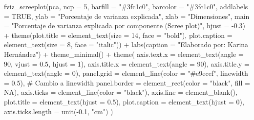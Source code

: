 \documentclass[
  10pt,
  letterpaper,
  DIV=11,
  numbers=noendperiod]{scrreprt}
\newenvironment{Shaded}{\begin{snugshade}}{\end{snugshade}}
\newcommand{\AttributeTok}[1]{\textcolor[rgb]{0.40,0.45,0.13}{#1}}
\newcommand{\CommentTok}[1]{\textcolor[rgb]{0.37,0.37,0.37}{#1}}
\newcommand{\ConstantTok}[1]{\textcolor[rgb]{0.56,0.35,0.01}{#1}}
\newcommand{\DecValTok}[1]{\textcolor[rgb]{0.68,0.00,0.00}{#1}}
\newcommand{\FloatTok}[1]{\textcolor[rgb]{0.68,0.00,0.00}{#1}}
\newcommand{\FunctionTok}[1]{\textcolor[rgb]{0.28,0.35,0.67}{#1}}
\newcommand{\NormalTok}[1]{\textcolor[rgb]{0.00,0.23,0.31}{#1}}
\newcommand{\SpecialCharTok}[1]{\textcolor[rgb]{0.37,0.37,0.37}{#1}}
\newcommand{\StringTok}[1]{\textcolor[rgb]{0.13,0.47,0.30}{#1}}
\begin{document}
\begin{Shaded}
\begin{Highlighting}[numbers=left,,]
\FunctionTok{fviz\_screeplot}\NormalTok{(pca,}
               \AttributeTok{ncp =} \DecValTok{5}\NormalTok{,}
               \AttributeTok{barfill =} \StringTok{"\#3fc1c0"}\NormalTok{,}
               \AttributeTok{barcolor =} \StringTok{"\#3fc1c0"}\NormalTok{,}
               \AttributeTok{addlabels =} \ConstantTok{TRUE}\NormalTok{,}
               \AttributeTok{ylab =} \StringTok{"Porcentaje de varianza explicada"}\NormalTok{,}
               \AttributeTok{xlab =} \StringTok{"Dimensiones"}\NormalTok{,}
               \AttributeTok{main =} \StringTok{"Porcentaje de varianza explicada por componente (Scree plot)"}\NormalTok{,}
               \AttributeTok{hjust =} \SpecialCharTok{{-}}\FloatTok{0.3}\NormalTok{) }\SpecialCharTok{+}
  \FunctionTok{theme}\NormalTok{(}\AttributeTok{plot.title =} \FunctionTok{element\_text}\NormalTok{(}\AttributeTok{size =} \DecValTok{14}\NormalTok{, }\AttributeTok{face =} \StringTok{"bold"}\NormalTok{),}
        \AttributeTok{plot.caption =} \FunctionTok{element\_text}\NormalTok{(}\AttributeTok{size =} \DecValTok{8}\NormalTok{, }\AttributeTok{face =} \StringTok{"italic"}\NormalTok{)) }\SpecialCharTok{+}
  \FunctionTok{labs}\NormalTok{(}\AttributeTok{caption =} \StringTok{"Elaborado por: Karina Hernández"}\NormalTok{) }\SpecialCharTok{+}
  \FunctionTok{theme\_minimal}\NormalTok{() }\SpecialCharTok{+}
    \FunctionTok{theme}\NormalTok{(}
        \AttributeTok{axis.text.x =} \FunctionTok{element\_text}\NormalTok{(}\AttributeTok{angle =} \DecValTok{90}\NormalTok{, }\AttributeTok{vjust =} \FloatTok{0.5}\NormalTok{, }\AttributeTok{hjust =} \DecValTok{1}\NormalTok{),}
        \AttributeTok{axis.title.x =} \FunctionTok{element\_text}\NormalTok{(}\AttributeTok{angle =} \DecValTok{90}\NormalTok{),}
        \AttributeTok{axis.title.y =} \FunctionTok{element\_text}\NormalTok{(}\AttributeTok{angle =} \DecValTok{0}\NormalTok{),}
        \AttributeTok{panel.grid =} \FunctionTok{element\_line}\NormalTok{(}\AttributeTok{color =} \StringTok{"\#e9ecef"}\NormalTok{, }\AttributeTok{linewidth =} \FloatTok{0.5}\NormalTok{),  }\CommentTok{\# Cambio a linewidth}
        \AttributeTok{panel.border =} \FunctionTok{element\_rect}\NormalTok{(}\AttributeTok{color =} \StringTok{"black"}\NormalTok{, }\AttributeTok{fill =} \ConstantTok{NA}\NormalTok{),}
        \AttributeTok{axis.ticks =} \FunctionTok{element\_line}\NormalTok{(}\AttributeTok{color =} \StringTok{"black"}\NormalTok{),}
        \AttributeTok{axis.line =} \FunctionTok{element\_blank}\NormalTok{(),}
        \AttributeTok{plot.title =} \FunctionTok{element\_text}\NormalTok{(}\AttributeTok{hjust =} \FloatTok{0.5}\NormalTok{),}
        \AttributeTok{plot.caption =} \FunctionTok{element\_text}\NormalTok{(}\AttributeTok{hjust =} \DecValTok{0}\NormalTok{),}
        \AttributeTok{axis.ticks.length =} \FunctionTok{unit}\NormalTok{(}\SpecialCharTok{{-}}\FloatTok{0.1}\NormalTok{, }\StringTok{"cm"}\NormalTok{)}
\NormalTok{    )}
\end{Highlighting}
\end{Shaded}
\end{document}
